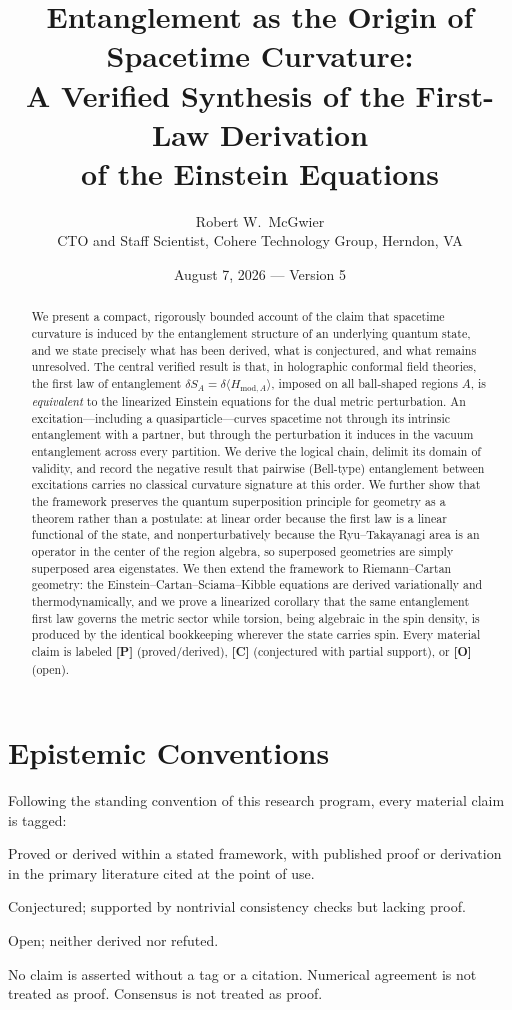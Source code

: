 \documentclass[11pt]{article}
\title{\textbf{Entanglement as the Origin of Spacetime Curvature:\\
A Verified Synthesis of the First-Law Derivation\\ of the Einstein Equations}}
\author{Robert W.\ McGwier\\
\small CTO and Staff Scientist, Cohere Technology Group, Herndon, VA}
\date{August 7, 2026 --- Version 5}
\theoremstyle{definition}
\newcommand{\pP}{\textbf{[P]}}
\newcommand{\pC}{\textbf{[C]}}
\newcommand{\pO}{\textbf{[O]}}
\begin{document}
\maketitle

\begin{abstract}
\noindent
We present a compact, rigorously bounded account of the claim that spacetime
curvature is induced by the entanglement structure of an underlying quantum
state, and we state precisely what has been derived, what is conjectured, and
what remains unresolved. The central verified result is that, in holographic
conformal field theories, the first law of entanglement
$\delta S_A=\delta\langle H_{\mathrm{mod},A}\rangle$, imposed on all
ball-shaped regions $A$, is \emph{equivalent} to the linearized Einstein
equations for the dual metric perturbation. An excitation---including a
quasiparticle---curves spacetime not through its intrinsic entanglement with a
partner, but through the perturbation it induces in the vacuum entanglement
across every partition. We derive the logical chain, delimit its domain of
validity, and record the negative result that pairwise (Bell-type)
entanglement between excitations carries no classical curvature signature at
this order. We further show that the framework preserves the quantum
superposition principle for geometry as a theorem rather than a postulate:
at linear order because the first law is a linear functional of the state,
and nonperturbatively because the Ryu--Takayanagi area is an operator in the
center of the region algebra, so superposed geometries are simply superposed
area eigenstates. We then extend the framework to Riemann--Cartan geometry:
the Einstein--Cartan--Sciama--Kibble equations are derived variationally and
thermodynamically, and we prove a linearized corollary that the same
entanglement first law governs the metric sector while torsion, being
algebraic in the spin density, is produced by the identical bookkeeping
wherever the state carries spin. Every material claim is labeled \pP{} (proved/derived), \pC{}
(conjectured with partial support), or \pO{} (open).
\end{abstract}

\section*{Epistemic Conventions}
Following the standing convention of this research program, every material
claim is tagged:
\begin{description}[leftmargin=2.2em,itemsep=0pt]
\item[\pP] Proved or derived within a stated framework, with published proof
or derivation in the primary literature cited at the point of use.
\item[\pC] Conjectured; supported by nontrivial consistency checks but lacking
proof.
\item[\pO] Open; neither derived nor refuted.
\end{description}
No claim is asserted without a tag or a citation. Numerical agreement is not
treated as proof. Consensus is not treated as proof.
\end{document}
